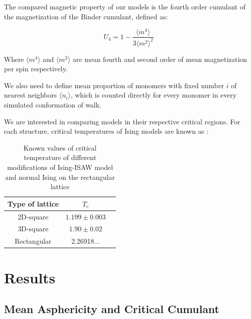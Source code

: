 \documentclass[aps,pre,amssymb,amsmath,twocolumn,floatfix]{revtex4-2}
\begin{document}
The compared magnetic property of our models is the fourth order cumulant of the magnetization of the Binder cumulant, defined as\cite{Selke2006}:

\begin{equation}
\label{eq:Cumulant}
U_{4} = 1 - \frac{\langle m^{4} \rangle}{3 \langle m^{2} \rangle^{2}}
\end{equation}

Where $\langle m^{4} \rangle$ and $\langle m^{2} \rangle$ are mean fourth and second order of mean magnetization per spin respectively.

We also need to define mean proportion of monomers with fixed number $i$ of nearest neighbors $\langle n_{i} \rangle$, which is counted directly for every monomer in every simulated conformation of walk.

We are interested in comparing models in their respective critical regions. For each structure, critical temperatures of Ising models are known as \cite{Foster2021,Selke2006}:

\begin{table}[h]
    \centering
    \begin{tabular}{|c|c|c|}
        \hline
        Type of lattice & $T_{c}$ \\ \hline
        2D-square & $1.199 \pm 0.003$\cite{Foster2021} \\ \hline
        3D-square & $1.90 \pm 0.02$\cite{Foster2021}\\ \hline
        Rectangular & 2.26918...\cite{Selke2006}\\ \hline
    \end{tabular}
    \caption{Known values of critical temperature of different modifications of Ising-ISAW model and normal Ising on the rectangular lattice}
    \label{tab:Ising_T_c}
\end{table}



\section{Results}

\subsection{Mean Asphericity and Critical Cumulant}
\end{document}
